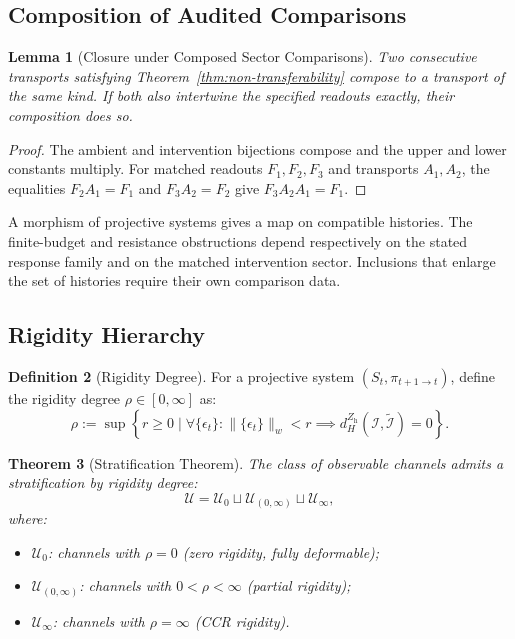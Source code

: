 \documentclass[11pt,a4paper]{article}
\theoremstyle{plain}
\newtheorem{theorem}{Theorem}[section]
\newtheorem{lemma}[theorem]{Lemma}
\theoremstyle{definition}
\newtheorem{definition}[theorem]{Definition}
\theoremstyle{remark}
\begin{document}
\subsection{Composition of Audited Comparisons}

\begin{lemma}[Closure under Composed Sector Comparisons]\label{lem:canonical-closure}
Two consecutive transports satisfying Theorem~\ref{thm:non-transferability} compose to a transport of the same kind. If both also intertwine the specified readouts exactly, their composition does so.
\end{lemma}
\begin{proof}
The ambient and intervention bijections compose and the upper and lower constants multiply. For matched readouts $F_1,F_2,F_3$ and transports $A_1,A_2$, the equalities $F_2 A_1=F_1$ and $F_3 A_2=F_2$ give $F_3 A_2 A_1=F_1$.
\end{proof}

A morphism of projective systems gives a map on compatible histories. The finite-budget and resistance obstructions depend respectively on the stated response family and on the matched intervention sector. Inclusions that enlarge the set of histories require their own comparison data.

\subsection{Rigidity Hierarchy}

\begin{definition}[Rigidity Degree]
For a projective system $(S_t, \pi_{t+1 \to t})$, define the rigidity degree $\rho \in [0, \infty]$ as:
\begin{equation}
    \rho := \sup \left\{ r \geq 0 \;\Big|\; \forall \{\epsilon_t\}: \|\{\epsilon_t\}\|_w < r \implies d_H^{Z_{\mathrm h}}(\mathcal{I}, \tilde{\mathcal{I}}) = 0 \right\}.
\end{equation}
\end{definition}

\begin{theorem}[Stratification Theorem]\label{thm:stratification}
The class of observable channels admits a stratification by rigidity degree:
\begin{equation}
    \mathcal{U} = \mathcal{U}_0 \sqcup \mathcal{U}_{(0,\infty)} \sqcup \mathcal{U}_\infty,
\end{equation}
where:
\begin{itemize}[leftmargin=*]
    \item $\mathcal{U}_0$: channels with $\rho = 0$ (zero rigidity, fully deformable);
    \item $\mathcal{U}_{(0,\infty)}$: channels with $0 < \rho < \infty$ (partial rigidity);
    \item $\mathcal{U}_\infty$: channels with $\rho = \infty$ (CCR rigidity).
\end{itemize}
\end{theorem}
\end{document}

